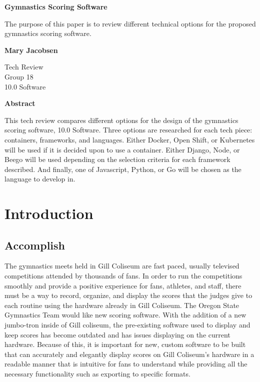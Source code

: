 \documentclass[letterpaper,10pt,draftclsnofoot,onecolumn,]{article}
\begin{document}
\noindent
\begin{titlepage}
    \begin{center}
        \vspace*{1cm}
        
        \textbf{Gymnastics Scoring Software}
        
        \vspace{0.5cm}
        The purpose of this paper is to review different technical options for the proposed gymnastics scoring software.
        
        \vspace{1.5cm}
        
        \textbf{Mary Jacobsen}
        
        Tech Review\\
        Group 18\\
        10.0 Software\\
        \vspace*{\fill}
        \begin{center}
            \textbf{\large{Abstract}}
        \end{center}
        \normalsize{This tech review compares different options for the design of the gymnastics scoring software, 10.0 Software. Three options are researched for each tech piece: containers, frameworks, and languages. Either Docker, Open Shift, or Kubernetes will be used if it is decided upon to use a container.  Either Django, Node, or Beego will be used depending on the selection criteria for each framework described. And finally, one of Javascript, Python, or Go will be chosen as the language to develop in.}
        
    \end{center}
\end{titlepage}

\tableofcontents
\newpage


\section{Introduction}

\subsection{Accomplish}
The gymnastics meets held in Gill Coliseum are fast paced, usually televised competitions attended by thousands of fans. In order to run the competitions smoothly and provide a positive experience for fans, athletes, and staff, there must be a way to record, organize, and display the scores that the judges give to each routine using the hardware already in Gill Coliseum. The Oregon State Gymnastics Team would like new scoring software. With the addition of a new jumbo-tron inside of Gill coliseum, the pre-existing software used to display and keep scores has become outdated and has issues displaying on the current hardware. Because of this, it is important for new, custom software to be built that can accurately and elegantly display scores on Gill Coliseum's hardware in a readable manner that is intuitive for fans to understand while providing all the necessary functionality such as exporting to specific formats.
\end{document}
